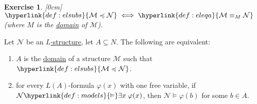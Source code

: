 \documentclass{article}
\let\models\vDash
\newtheorem{nexercise}[nthm]{Exercise}
\begin{document}
\begin{nexercise}\label{ex:3.7}
  [0cm]
  $ \hyperlink{def:elsubs}{\mathcal{M}\preccurlyeq \mathcal{N}} \iff \hyperlink{def:eleqa}{\mathcal{M} \equiv_M \mathcal{N}}$ (where $M$ is the \hyperlink{def:str}{domain} of $\mathcal{M}$).
\end{nexercise}
\begin{nlemma}\label{lem:3.8}
  Let $\mathcal{N}$ be an \hyperlink{def:str}{$L$-structure}, let $A \subseteq N$. The following are equivalent:
  \begin{enumerate}[label=(\roman*)]
    \item $A$ is the \hyperlink{def:str}{domain} of a structure $\mathcal{M}$ such that $\hyperlink{def:elsubs}{\mathcal{M} \preccurlyeq \mathcal{N}}$.
    \item for every $L(A)$-formula $\varphi(x)$ with one free variable, if $\mathcal{N} \hyperlink{def:models}{\models} \exists x \; \varphi(x)$, then $\mathcal{N} \models \varphi(b)$ for some $b \in A$.
  \end{enumerate}
\end{nlemma}
\end{document}
